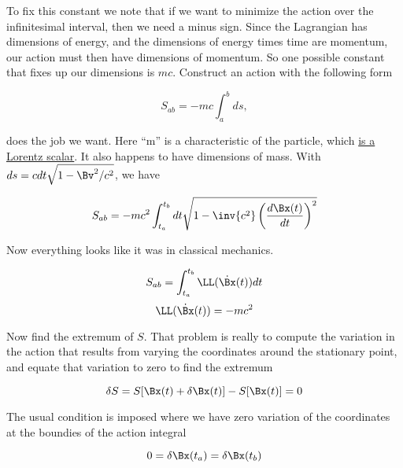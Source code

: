 To fix this constant we note that if we want to minimize the action over the infinitesimal interval, then we need a minus sign.  Since the Lagrangian has dimensions of energy, and the dimensions of energy times time are momentum, our action must then have dimensions of momentum.  So one possible constant that fixes up our dimensions is $mc$.  Construct an action with the following form

\begin{equation}\label{eqn:relativisticElectrodynamicsL7:190}
S_{ab} = - m c\int_a^b ds,
\end{equation}

does the job we want.  Here ``m'' is a characteristic of the particle, which \underline{is a Lorentz scalar}.  It also happens to have dimensions of mass.  With $ds = c dt \sqrt{1 - \Bv^2/c^2}$, we have

\begin{equation}\label{eqn:relativisticElectrodynamicsL7:200}
S_{ab} = - m c^2 \int_{t_a}^{t_b} dt \sqrt{ 1 - \inv{c^2} \left( \frac{d \Bx(t) }{dt} \right)^2 }
\end{equation}

Now everything looks like it was in classical mechanics.

\begin{equation}\label{eqn:relativisticElectrodynamicsL7:210}
S_{ab} = \int_{t_a}^{t_b} \LL(\dot{\Bx}(t)) dt
\end{equation}
\begin{equation}\label{eqn:relativisticElectrodynamicsL7:220}
\LL(\dot{\Bx}(t)) = -m c^2 
\end{equation}

Now find the extremum of $S$.  That problem is really to compute the variation in the action that results from varying the coordinates around the stationary point, and equate that variation to zero to find the extremum

\begin{equation}\label{eqn:relativisticElectrodynamicsL7:230}
\delta S = S[\Bx(t) + \delta \Bx(t)] - S[ \Bx(t) ] = 0
\end{equation}

The usual condition is imposed where we have zero variation of the coordinates at the boundies of the action integral

\begin{equation}\label{eqn:relativisticElectrodynamicsL7:231}
0 = \delta \Bx(t_a) = \delta \Bx(t_b) 
\end{equation}

